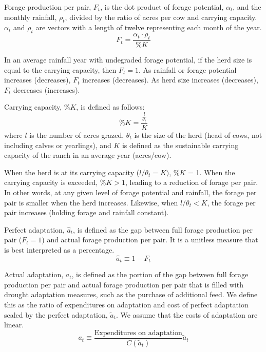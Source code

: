 \documentclass[11pt]{article}
\begin{document}
Forage production per pair, $F_t$, is the dot product of forage potential, $\alpha_t$, and the monthly rainfall, $\rho_t$, divided by the ratio of acres per cow and carrying capacity. $\alpha_t$ and $\rho_t$ are vectors with a length of twelve representing each month of the year. 
\begin{equation}
F_t = \frac{\alpha_t \cdot \rho_t}{\%K}
\end{equation}

In an average rainfall year with undegraded forage potential, if the herd size is equal to the carrying capacity, then $F_t = 1$. As rainfall or forage potential increases (decreases), $F_t$ increases (decreases). As herd size increases (decreases), $F_t$ decreases (increases). 

Carrying capacity, $\%K$, is defined as follows:
\begin{equation}
\%K = \frac{\frac{l}{\theta_t}}{K}
\end{equation}
where $l$ is the number of acres grazed, $\theta_t$ is the size of the herd (head of cows, not including calves or yearlings), and $K$ is defined as the sustainable carrying capacity of the ranch in an average year (acres/cow).

When the herd is at its carrying capacity ($l/\theta_t = K)$, $\%K$ = 1. When the carrying capacity is exceeded, $\%K > 1$, leading to a reduction of forage per pair. In other words, at any given level of forage potential and rainfall, the forage per pair is smaller when the herd increases. Likewise, when $l / \theta_t < K$, the forage per pair increases (holding forage and rainfall constant). 

Perfect adaptation, $\hat{a}_t$, is defined as the gap between full forage production per pair ($F_t = 1$) and actual forage production per pair. It is a unitless measure that is best interpreted as a percentage.
\begin{equation}
\hat{a}_t \equiv 1 - F_t
\end{equation}

Actual adaptation, $a_t$, is defined as the portion of the gap between full forage production per pair and actual forage production per pair that is filled with drought adaptation measures, such as the purchase of additional feed. We define this as the ratio of expenditures on adaptation and cost of perfect adaptation scaled by the perfect adaptation, $\tilde{a}_t$. We assume that the costs of adaptation are linear. 
\begin{equation}
a_t \equiv \frac{\text{Expenditures on adaptation}}{C(\tilde{a}_t)} \tilde{a}_t
\end{equation}
\end{document}
